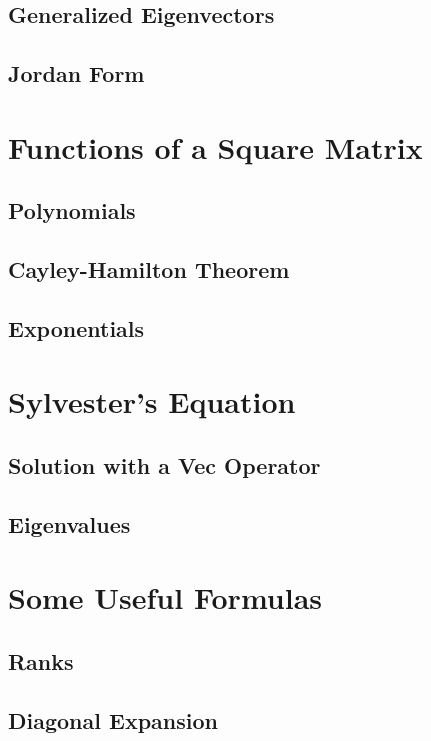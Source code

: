 \documentclass{article}
\begin{document}
\subsection{Generalized Eigenvectors}

\subsection{Jordan Form}

\section{Functions of a Square Matrix}

\subsection{Polynomials}

\subsection{Cayley-Hamilton Theorem}

\subsection{Exponentials}

\section{Sylvester's Equation}

\subsection{Solution with a Vec Operator}

\subsection{Eigenvalues}

\section{Some Useful Formulas}

\subsection{Ranks}

\subsection{Diagonal Expansion}
\end{document}
